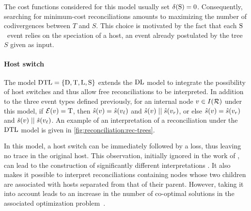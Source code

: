 The cost functions considered for this model usually set \(\delta\kern.1pt(\mathrm{S}) = 0\).
Consequently, searching for minimum-cost reconciliations amounts to maximizing the number of codivergences between \(T\) and \(S\).
This choice is motivated by the fact that each \(\mathrm{S}\)~event relies on the speciation of a host, an event already postulated by the tree \(S\) given as input.

\paragraph{Host switch~\textup{\parencite{Tofigh2011SimultaneousIdentificationDuplications,Ranwez2016InferringGeneDuplications}}}
The model \(\mathrm{D}\mathrm{T}\mathrm{L} = \{\mathrm{D}, \mathrm{T}, \mathrm{L}, \mathrm{S}\}\) extends the \(\mathrm{D}\mathrm{L}\) model to integrate the possibility of host switches and thus allow free reconciliations to be interpreted.
In addition to the three event types defined previously, for an internal node \(v \in I(\mathcal{R})\) under this model, if \(\mathcal{E}(v) = \mathrm{T}\), then \(\hat{s}(v) = \hat{s}(v_\mathit{\ell})\) and \(\hat{s}(v) \mathrel{||} \hat{s}(v_r)\), or else \(\hat{s}(v) = \hat{s}(v_r)\) and \(\hat{s}(v) \mathrel{||} \hat{s}(v_\mathit{\ell})\).
An example of an interpretation of a reconciliation under the \(\mathrm{D}\mathrm{T}\mathrm{L}\) model is given in \cref{fig:reconciliation:rec-trees}.

In this model, a host switch can be immediately followed by a loss, thus leaving no trace in the original host.
This observation, initially ignored in the work of \textcite{Tofigh2011SimultaneousIdentificationDuplications}, can lead to the construction of significantly different interpretations \parencite{Ranwez2016InferringGeneDuplications}.
It also makes it possible to interpret reconciliations containing nodes whose two children are associated with hosts separated from that of their parent.
However, taking it into account leads to an increase in the number of co-optimal solutions in the associated optimization problem~\parencite{Weiner2021ImprovedDuplicationTransfer}.

